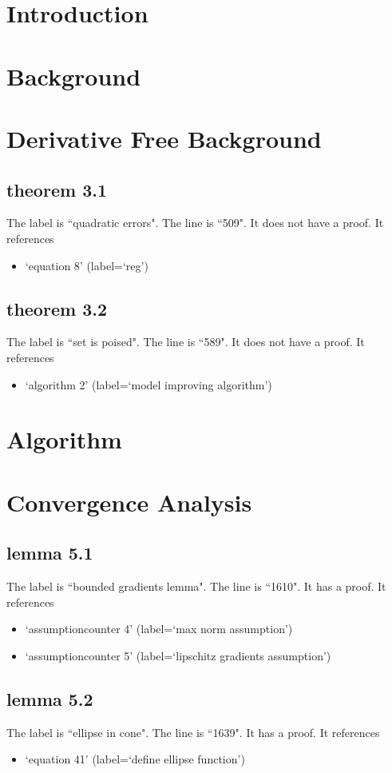 \documentclass{article}
\begin{document}
\section{Introduction}
\section{Background}
\section{Derivative Free Background}
\subsection{theorem 3.1}
The label is ``quadratic errors".
The line is ``509".
It does not have a proof.
It references \begin{itemize}
\item `equation 8' (label=`reg')
\end{itemize}
\subsection{theorem 3.2}
The label is ``set is poised".
The line is ``589".
It does not have a proof.
It references \begin{itemize}
\item `algorithm 2' (label=`model improving algorithm')
\end{itemize}
\section{Algorithm}
\section{Convergence Analysis}
\subsection{lemma 5.1}
The label is ``bounded gradients lemma".
The line is ``1610".
It has a proof.
It references \begin{itemize}
\item `assumptioncounter 4' (label=`max norm assumption')
\item `assumptioncounter 5' (label=`lipschitz gradients assumption')
\end{itemize}
\subsection{lemma 5.2}
The label is ``ellipse in cone".
The line is ``1639".
It has a proof.
It references \begin{itemize}
\item `equation 41' (label=`define ellipse function')
\end{itemize}
\end{document}
